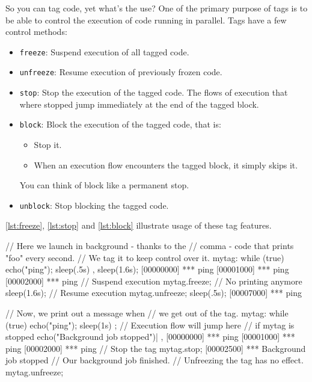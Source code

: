 \documentclass[openright,twoside,12pt]{report}
\newcommand{\lst}[1]{\autoref{lst:#1}}
\begin{document}
So you can tag code, yet what's the use? One of the primary purpose of
tags is to be able to control the execution of code running in
parallel. Tags have a few control methods:

\begin{itemize}
\item \texttt{freeze}: Suspend execution of all tagged code.
\item \texttt{unfreeze}: Resume execution of previously frozen code.
\item \texttt{stop}: Stop the execution of the tagged code. The flows
  of execution that where stopped jump immediately at the end of the
  tagged block.
\item \texttt{block}: Block the execution of the tagged code, that is:
  \begin{itemize}
  \item Stop it.
  \item When an execution flow encounters the tagged block, it simply
    skips it.
  \end{itemize}
  You can think of block like a permanent stop.
\item \texttt{unblock}: Stop blocking the tagged code.
\end{itemize}

\autoref{lst:freeze}, \lst{stop} and \lst{block} illustrate usage of these tag
features.

\begin{urbiscript}[caption=Freezing/unfreezing code execution, label=lst:freeze]
// Here we launch in background - thanks to the
// comma - code that prints "foo" every second.
// We tag it to keep control over it.
mytag:
{
  while (true)
  {
    echo("ping");
    sleep(.5s)
  }
},
sleep(1.6s);
[00000000] *** ping
[00001000] *** ping
[00002000] *** ping
// Suspend execution
mytag.freeze;
// No printing anymore
sleep(1.6s);
// Resume execution
mytag.unfreeze;
sleep(.5s);
[00007000] *** ping
\end{urbiscript}

\begin{urbiscript}[caption=Stopping code execution, label=lst:stop]
// Now, we print out a message when
// we get out of the tag.
{
  mytag:
  {
    while (true)
    {
      echo("ping"); sleep(1s)
    }
  };
  // Execution flow will jump here
  // if mytag is stopped
  echo("Background job stopped")|
},
[00000000] *** ping
[00001000] *** ping
[00002000] *** ping
// Stop the tag
mytag.stop;
[00002500] *** Background job stopped
// Our background job finished.
// Unfreezing the tag has no effect.
mytag.unfreeze;
\end{urbiscript}
\end{document}

